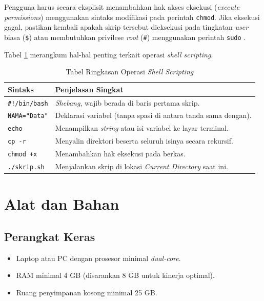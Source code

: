 Pengguna harus secara eksplisit menambahkan hak akses eksekusi (\textit{execute permissions}) menggunakan sintaks modifikasi pada perintah \texttt{chmod}. Jika eksekusi gagal, pastikan kembali apakah skrip tersebut dieksekusi pada tingkatan \textit{user} biasa (\texttt{\$}) atau membutuhkan privilese \textit{root} (\texttt{\#}) menggunakan perintah \texttt{sudo} \cite{shotts2019linux}.

Tabel \ref{tab:m04-dasar-teori} merangkum hal-hal penting terkait operasi \textit{shell scripting}.

\begin{table}[H]
    \caption{Tabel Ringkasan Operasi \textit{Shell Scripting}}
    \label{tab:m04-dasar-teori}
    \centering
    \begin{tabular}{|l|p{10cm}|}
        \hline
        \textbf{Sintaks} & \textbf{Penjelasan Singkat} \\ \hline
        \texttt{\#!/bin/bash} & \textit{Shebang}, wajib berada di baris pertama skrip. \\ \hline
        \texttt{NAMA="Data"} & Deklarasi variabel (tanpa spasi di antara tanda sama dengan). \\ \hline
        \texttt{echo} & Menampilkan \textit{string} atau isi variabel ke layar terminal. \\ \hline
        \texttt{cp -r} & Menyalin direktori beserta seluruh isinya secara rekursif. \\ \hline
        \texttt{chmod +x} & Menambahkan hak eksekusi pada berkas. \\ \hline
        \texttt{./skrip.sh} & Menjalankan skrip di lokasi \textit{Current Directory} saat ini. \\ \hline
    \end{tabular}
\end{table}

\newpage
\section{Alat dan Bahan}
\label{sec:m04-alat-bahan}

\subsection{Perangkat Keras}
\begin{itemize}
	\item Laptop atau PC dengan prosesor minimal \textit{dual-core}.
	\item RAM minimal 4 GB (disarankan 8 GB untuk kinerja optimal).
	\item Ruang penyimpanan kosong minimal 25 GB.
\end{itemize}

